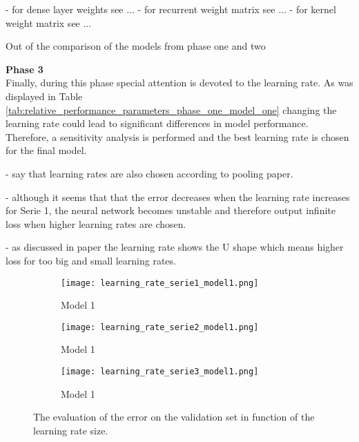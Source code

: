 - for dense layer weights see ...
- for recurrent weight matrix see ...
- for kernel weight matrix see ...

Out of the comparison of the models from phase one and two

\textbf{Phase 3}\\
Finally, during this phase special attention is devoted to the learning rate. As was displayed in Table \ref{tab:relative_performance_parameters_phase_one_model_one} changing the learning rate could lead to significant differences in model performance. Therefore, a sensitivity analysis is performed and the best learning rate is chosen for the final model. 

- say that learning rates are also chosen according to pooling paper. 

- although it seems that that the error decreases when the learning rate increases for Serie 1, the neural network becomes unstable and therefore output infinite loss when higher learning rates are chosen.

- as discussed in paper \cite{Greff2017} the learning rate shows the U shape which means higher loss for too big and small learning rates. 

\begin{figure}[h]
	\centering
	\begin{subfigure}{0.49\linewidth}
		\texttt{[image: learning\_rate\_serie1\_model1.png]}
		\caption{Model 1}
	\end{subfigure}	
	\begin{subfigure}{0.49\linewidth}
		\texttt{[image: learning\_rate\_serie2\_model1.png]}
		\caption{Model 1}
	\end{subfigure}
	\begin{subfigure}{0.5\linewidth}
		\texttt{[image: learning\_rate\_serie3\_model1.png]}
		\caption{Model 1}
	\end{subfigure}
	\caption{The evaluation of the error on the validation set in function of the learning rate size.}
	\label{fig:learning_rate_model1}
\end{figure}



